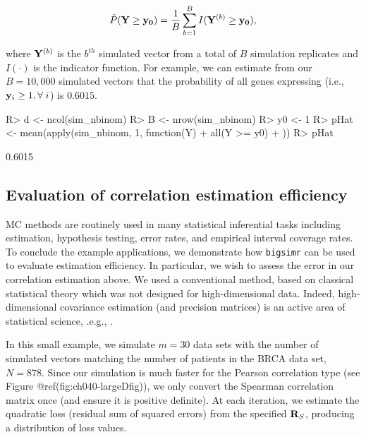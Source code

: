 \documentclass[
]{jss}
\begin{document}
\[
\hat{P}( {\bf Y} \ge {\bf y_0 } ) = \frac{1}{B} \sum_{b=1}^B I( {\bf Y}^{ (b) } \ge {\bf y_0} ),
\]

where \({\bf Y}^{(b)}\) is the \(b^{th}\) simulated vector from a total
of \(B\) simulation replicates and \(I(\cdot)\) is the indicator
function. For example, we can estimate from our \(B=10,000\) simulated
vectors that the probability of all genes expressing (i.e.,
\({\bf y}_i \geq 1, \forall \; i\)) is \(0.6015\).

\begin{CodeChunk}
\begin{CodeInput}
R> d <- ncol(sim_nbinom)
R> B <- nrow(sim_nbinom)
R> y0 <- 1
R> pHat <- mean(apply(sim_nbinom, 1, function(Y) {
+   all(Y >= y0)
+ }))
R> pHat
\end{CodeInput}
\begin{CodeOutput}
[1] 0.6015
\end{CodeOutput}
\end{CodeChunk}

\hypertarget{evaluation-of-correlation-estimation-efficiency}{%
\subsection{Evaluation of correlation estimation
efficiency}\label{evaluation-of-correlation-estimation-efficiency}}

MC methods are routinely used in many statistical inferential tasks
including estimation, hypothesis testing, error rates, and empirical
interval coverage rates. To conclude the example applications, we
demonstrate how \texttt{bigsimr} can be used to evaluate estimation
efficiency. In particular, we wish to assess the error in our
correlation estimation above. We used a conventional method, based on
classical statistical theory which was not designed for high-dimensional
data. Indeed, high-dimensional covariance estimation (and precision
matrices) is an active area of statistical science, .e.g.,
\citep{Won2013g, VanWieringen2016}.

In this small example, we simulate \(m=30\) data sets with the number of
simulated vectors matching the number of patients in the BRCA data set,
\(N=878\). Since our simulation is much faster for the Pearson
correlation type (see Figure @ref(fig:ch040-largeDfig)), we only convert
the Spearman correlation matrix once (and ensure it is positive
definite). At each iteration, we estimate the quadratic loss (residual
sum of squared errors) from the specified \({\bf R}_{S}\), producing a
distribution of loss values.
\end{document}
